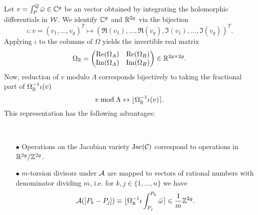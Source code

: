 \documentclass[main.tex]{subfiles}
\begin{document}
   Let $v = \int_P^Q \bar{\omega} \in \mathbb{C}^g$ be an vector obtained by integrating the holomorphic differentials in
   $\mathcal{W}$.
   We identify $\mathbb{C}^g$ and $\mathbb{R}^{2g}$ via the bijection
   \begin{equation*}
    \iota: v = (v_1,\dots,v_g)^T \mapsto (\Re(v_1),\dots,\Re(v_g),\Im(v_1),\dots,\Im(v_g))^T.
   \end{equation*}
    Applying $\iota$ to the columns of $\Omega$ yields the invertible real matrix
   \begin{equation*}
    \Omega_{\mathbb{R}} = 
   \begin{pmatrix}
     \operatorname{Re}(\Omega_A) & \operatorname{Re}(\Omega_B) \\
     \operatorname{Im}(\Omega_A) & \operatorname{Im}(\Omega_B)
    \end{pmatrix} \in \mathbb{R}^{2g \times 2g}.
   \end{equation*}
   Now, reduction of $v$ modulo $\Lambda$ corresponds bijectively to taking the fractional part of $\Omega_{\mathbb{R}}^{-1}\iota(v)$
   \begin{equation*}
    v \bmod \Lambda \leftrightarrow \lfloor \Omega_{\mathbb{R}}^{-1}\iota(v) \rceil.
   \end{equation*}
   This representation has the following advantages:
   \begin{rmk} \
    \begin{itemize}
     \item[$\bullet$] Operations on the Jacobian variety $\operatorname{Jac}(\mathcal{C})$ correspond to operations in $\mathbb{R}^{2g}/\mathbb{Z}^{2g}$.
     \item[$\bullet$] $m$-torsion divisors under $\mathcal{A}$ are mapped to vectors of rational numbers with 
     denominator dividing $m$, i.e. for $k,j \in \{ 1,\dots,n \}$ we have
     \begin{equation*}
      \mathcal{A}([P_k - P_j]) \equiv \lfloor \Omega_{\mathbb{R}}^{-1} \iota \int_{P_j}^{P_k} \bar{\omega}
      \rceil \in \frac{1}m\mathbb{Z}^{2g}.
     \end{equation*}
    \end{itemize}
   \end{rmk}

\biblio
\end{document}
